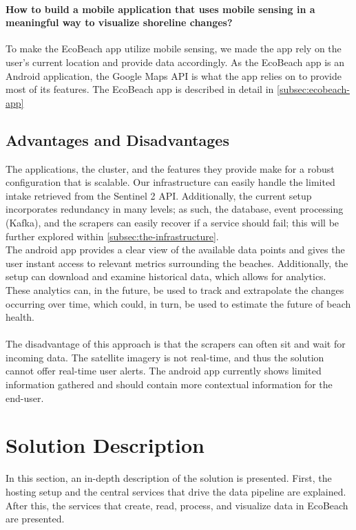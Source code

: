 \paragraph{How to build a mobile application that uses mobile sensing in a meaningful way to visualize shoreline changes?} To make the EcoBeach app utilize mobile sensing, we made the app rely on the user's current location and provide data accordingly. As the EcoBeach app is an Android application, the Google Maps API is what the app relies on to provide most of its features. The EcoBeach app is described in detail in \autoref{subsec:ecobeach-app}

\subsection{Advantages and Disadvantages}

The applications, the cluster, and the features they provide make for a robust configuration that is scalable. Our infrastructure can easily handle the limited intake retrieved from the Sentinel 2 API. Additionally, the current setup incorporates redundancy in many levels; as such, the database, event processing (Kafka), and the scrapers can easily recover if a service should fail; this will be further explored within \autoref{subsec:the-infrastructure}.\\ 
The android app provides a clear view of the available data points and gives the user instant access to relevant metrics surrounding the beaches. Additionally, the setup can download and examine historical data, which allows for analytics. These analytics can, in the future, be used to track and extrapolate the changes occurring over time, which could, in turn, be used to estimate the future of beach health.\\\\

\noindent The disadvantage of this approach is that the scrapers can often sit and wait for incoming data. The satellite imagery is not real-time, and thus the solution cannot offer real-time user alerts. The android app currently shows limited information gathered and should contain more contextual information for the end-user. 

\section{Solution Description}

In this section, an in-depth description of the solution is presented. First, the hosting setup and the central services that drive the data pipeline are explained. After this, the services that create, read, process, and visualize data in EcoBeach are presented.

